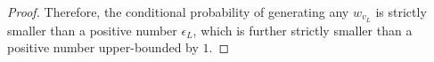 \begin{proof}
    Therefore, the conditional probability of generating any $w_{v_L}$ is strictly smaller than a positive number $\epsilon_L$, which is further strictly smaller than a positive number upper-bounded by $1$.
\end{proof}











